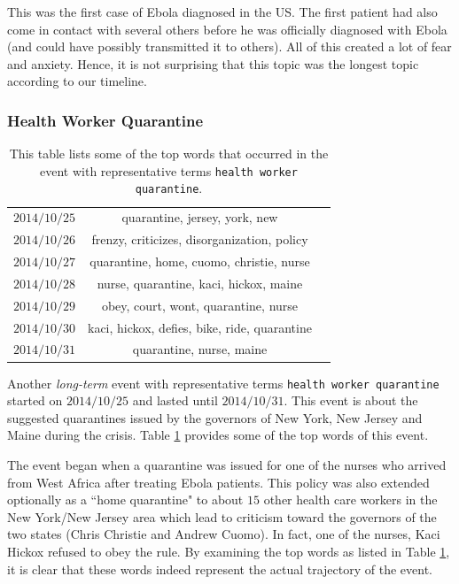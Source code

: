 This was the first case of Ebola diagnosed in the US.  The first patient had also come in contact with several
others before he was officially diagnosed with Ebola (and could have possibly transmitted it to others).  
All of this created a lot of fear and anxiety.  
Hence, it is not surprising that this
topic was the longest topic according to our timeline.

\subsubsection{Health Worker Quarantine}
\begin{table}
\begin{tabular}{c | c | c}
$2014/10/25$ & quarantine, jersey, york, new\\
$2014/10/26$ & frenzy, criticizes, disorganization, policy\\
$2014/10/27$ & quarantine, home, cuomo, christie, nurse\\
$2014/10/28$ & nurse, quarantine, kaci, hickox, maine\\
$2014/10/29$ & obey, court, wont, quarantine, nurse\\
$2014/10/30$ & kaci, hickox, defies, bike, ride, quarantine\\
$2014/10/31$ & quarantine, nurse, maine\\
\end{tabular}
\caption{This table lists some of the top words that occurred in the event with representative terms \texttt{health worker quarantine}.}
\label{tab:health_worker_quarantine}
\end{table}
Another \emph{long-term} event with representative terms \texttt{health worker quarantine}
started on $2014/10/25$ and lasted until $2014/10/31$.  This event is about the suggested
quarantines issued by the governors of New York, New Jersey and Maine during the crisis.
Table \ref{tab:health_worker_quarantine} provides some of the top words
of this event.

The event began when a quarantine was issued for one of the nurses who arrived
from West Africa after treating Ebola patients.  This policy
was also extended optionally as a ``home quarantine" to about $15$ other
health care workers in the New York/New Jersey area which
lead to criticism toward the governors of the two states (Chris Christie and
Andrew Cuomo).  In fact, one of the nurses, Kaci Hickox refused to obey the rule.
By examining the top words as listed in Table \ref{tab:health_worker_quarantine},
it is clear that these words indeed represent the actual trajectory of the event.

